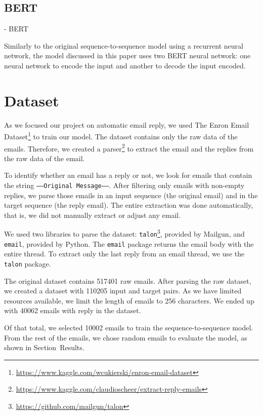 \documentclass[letterpaper]{article}
\begin{document}
\subsection{BERT}

\cite{DBLP:journals/corr/abs-1810-04805} - BERT

Similarly to the original sequence-to-sequence model using a recurrent neural network, the model discussed in this paper uses two BERT neural network: one neural network to encode the input and another to decode the input encoded.


\section{Dataset}

As we focused our project on automatic email reply, we used The Enron Email Dataset\footnote{\href{https://www.kaggle.com/wcukierski/enron-email-dataset}{https://www.kaggle.com/wcukierski/enron-email-dataset}} to train our model. The dataset contains only the raw data of the emails. Therefore, we created a parser\footnote{\href{https://www.kaggle.com/claudioscheer/extract-reply-emails}{https://www.kaggle.com/claudioscheer/extract-reply-emails}} to extract the email and the replies from the raw data of the email.

To identify whether an email has a reply or not, we look for emails that contain the string \texttt{-----Original Message-----}. After filtering only emails with non-empty replies, we parse those emails in an input sequence (the original email) and in the target sequence (the reply email). The entire extraction was done automatically, that is, we did not manually extract or adjust any email.

We used two libraries to parse the dataset: \texttt{talon}\footnote{\href{https://github.com/mailgun/talon}{https://github.com/mailgun/talon}}, provided by Mailgun, and \texttt{email}, provided by Python. The \texttt{email} package returns the email body with the entire thread. To extract only the last reply from an email thread, we use the \texttt{talon} package.

The original dataset contains \num{517401} raw emails. After parsing the raw dataset, we created a dataset with \num{110205} input and target pairs. As we have limited resources available, we limit the length of emails to \num{256} characters. We ended up with \num{40062} emails with reply in the dataset.

Of that total, we selected \num{10002} emails to train the sequence-to-sequence model. From the rest of the emails, we chose random emails to evaluate the model, as shown in Section~Results.
\end{document}
